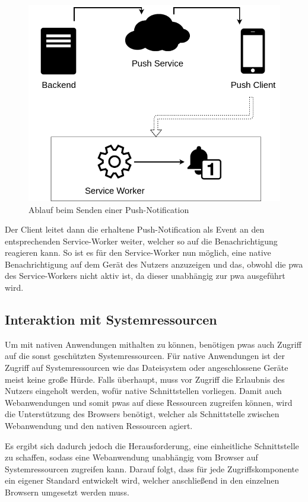 \documentclass[12pt, parskip=half]{scrartcl}       %
\begin{document}
\begin{figure}[h]
  \centering
  \includegraphics[width=\textwidth]{src/Push-API.png}
  \caption{Ablauf beim Senden einer Push-Notification}
  \label{fig:push_api}
\end{figure}


Der Client leitet dann die erhaltene Push-Notification als Event an den entsprechenden Service-Worker weiter, welcher so auf die Benachrichtigung reagieren kann.
So ist es für den Service-Worker nun möglich, eine native Benachrichtigung auf dem Gerät des Nutzers anzuzeigen und das, obwohl die \ac{pwa} des Service-Workers nicht aktiv ist, da dieser unabhängig zur \ac{pwa} ausgeführt wird.


\subsection{Interaktion mit Systemressourcen}

Um mit nativen Anwendungen mithalten zu können, benötigen \acp{pwa} auch Zugriff auf die sonst geschützten Systemressourcen.
Für native Anwendungen ist der Zugriff auf Systemressourcen wie das Dateisystem oder angeschlossene Geräte meist keine große Hürde.
Falls überhaupt, muss vor Zugriff die Erlaubnis des Nutzers eingeholt werden, wofür native Schnittstellen vorliegen.
Damit auch Webanwendungen und somit \acp{pwa} auf diese Ressourcen zugreifen können, wird die Unterstützung des Browsers benötigt, welcher als Schnittstelle zwischen Webanwendung und den nativen Ressourcen agiert.

Es ergibt sich dadurch jedoch die Herausforderung, eine einheitliche Schnittstelle zu schaffen, sodass eine Webanwendung unabhängig vom Browser auf Systemressourcen zugreifen kann.
Darauf folgt, dass für jede Zugriffskomponente ein eigener Standard entwickelt wird, welcher anschließend in den einzelnen Browsern umgesetzt werden muss.
\end{document}
